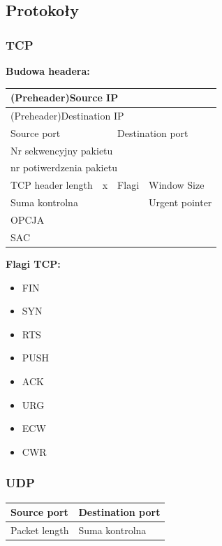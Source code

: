 \subsection{Protokoły}
\subsubsection{TCP}
\textbf{Budowa headera:\\}
\begin{table}[H]
	\begin{tabular}{|c|c|c|c|c|}
		\hline
		\multicolumn{5}{|l|}{(Preheader)Source IP}                 \\ \hline
		\multicolumn{5}{|l|}{(Preheader)Destination IP}                 \\ \hline
		\multicolumn{2}{|l|}{Source port} & \multicolumn{3}{l|}{Destination port}                \\ \hline
		\multicolumn{5}{|l|}{Nr sekwencyjny pakietu}                                             \\ \hline
		\multicolumn{5}{|l|}{nr potiwerdzenia pakietu}                                           \\ \hline
		TCP header length       & x       & Flagi          & \multicolumn{2}{l|}{Window Size}    \\ \hline
		\multicolumn{3}{|l|}{Suma kontrolna}               & \multicolumn{2}{l|}{Urgent pointer} \\ \hline
		\multicolumn{5}{|l|}{OPCJA}  \\ \hline
		\multicolumn{5}{|l|}{SAC}  \\ \hline
	\end{tabular}
\end{table}

\textbf{Flagi TCP:\\}
\begin{itemize}
	\item FIN
	\item SYN
	\item RTS
	\item PUSH
	\item ACK
	\item URG
	\item ECW
	\item CWR
\end{itemize}

\subsubsection{UDP}
\begin{table}[h]
	\begin{tabular}{|l|l|l|l|l|}
		\hline
		\multicolumn{2}{|l|}{Source port}   & \multicolumn{3}{l|}{Destination port} \\ \hline
		\multicolumn{2}{|l|}{Packet length} & \multicolumn{3}{l|}{Suma kontrolna}   \\ \hline
	\end{tabular}
\end{table}

